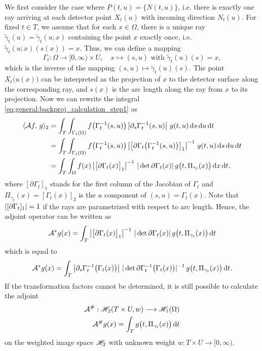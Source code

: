 \documentclass{amsart}
\begin{document}
%
We first consider the case where $P(t,u) = \lbrace N(t,u)\rbrace$, i.e. there is exactly one ray arriving at each detector point 
$X_t(u)$ with incoming direction $N_t(u)$. For fixed $t \in T$, we assume that for each $x \in \Omega$, there is a unique ray 
$\tilde \gamma_t(u) = \tilde \gamma_t(u; x)$ containing the point $x$ exactly once, i.e. $\tilde \gamma_t(u; x)(s(x)) = x$. Thus, we can 
define a 
mapping
%
\begin{equation*}
 \Gamma_t: \Omega \to [0, \infty) \times U,\quad x \mapsto (s, u) \text{ with } \tilde \gamma_t(u)(s) = x,
\end{equation*}
%
which is the inverse of the mapping $(s,u) \mapsto \tilde \gamma_t(u)(s)$. The point $X_t\big(u(x)\big)$ can be interpreted as the 
projection of 
$x$ to the detector surface along the corresponding ray, and $s(x)$ is the arc length along the ray from $x$ to its projection. 
Now we can rewrite the integral \eqref{eq:general:backproj_calculation_step1} as
%
\begin{align*}
 \langle {\ensuremath{\mathcal{A}}} f,\,g\rangle_2
 &= \int_T \int_{\Gamma_t(\Omega)} f\big(\Gamma_t^{-1}(s,u)\big) \left| \partial_s \Gamma_t^{-1}(s,u) \right|\, g(t, u)\, \mathrm{d} s\, \mathrm{d} u\, 
 \mathrm{d} t  \\
 &= \int_T \int_{\Gamma_t(\Omega)} f\big(\Gamma_t^{-1}(s,u)\big) \left| \big[\partial \Gamma_t\big(\Gamma_t^{-1}(s,u)\big)\big]_1 \right|^{-1}\, 
 g(t, u)\, \mathrm{d}  s\, \mathrm{d} u\, \mathrm{d} t \\
 &= \int_T \int_\Omega f(x) \left| \big[\partial \Gamma_t(x)\big]_1 \right|^{-1}\, |\operatorname*{det}{\partial \Gamma_t(x)}|\, 
 g\big(t, \Pi_{\gamma_t}(x)\big)
 \, \mathrm{d} x\, \mathrm{d} t,
\end{align*}
%
where $[\partial \Gamma_t]_1$ stands for the first column of the Jacobian of $\Gamma_t$ and $\Pi_{\gamma_t}(x) = [\Gamma_t(x)]_2$ is the 
$u$ component of $(s, u) = \Gamma_t(x)$. Note that $|[\partial \Gamma_t]_1| = 1$ if the rays are parametrized with respect to arc 
length. Hence, the adjoint operator can be written as
%
\begin{equation}
 \label{eq:general:backproj_onedir}
 {\ensuremath{{\mathcal{A}}^*}} g(x) = \int_T \left| \big[\partial \Gamma_t(x)\big]_1 \right|^{-1}\, |\operatorname*{det}{\partial \Gamma_t(x)}|\, g\big(t, 
\Pi_{\gamma_t}(x)\big)\, 
 \mathrm{d} t
\end{equation}
%
which is equal to
%
\begin{equation}
 \label{eq:general:backproj_onedir_alt}
 {\ensuremath{{\mathcal{A}}^*}} g(x) = \int_T \left| \partial_s \Gamma_t^{-1}\big(\Gamma_t(x)\big) \right|\, 
 |\operatorname*{det}{\partial \Gamma_t^{-1}\big(\Gamma_t(x)\big)}|^{-1}\, g\big(t, \Pi_{\gamma_t}(x)\big)\, \mathrm{d} t.
\end{equation}
%
If the transformation factors cannot be determined, it is still possible to calculate the adjoint
%
\begin{align}
 {\ensuremath{\mathcal{A}}}^\#: {\mathscr{H}}_2(T \times U, w) \longrightarrow {\ensuremath{\mathscr{H}}}_1(\Omega) \notag \\
 \label{eq:general:backproj_onedir_weighted}
 {\ensuremath{\mathcal{A}}}^\# g(x) = \int_T g\big(t, \Pi_{\gamma_t}(x)\big)\, \mathrm{d} t
\end{align}
%
on the weighted image space ${\mathscr{H}}_2$ with unknown weight $w: T \times U \to [0, \infty)$.%
\vspace{5ex}%
\end{document}
